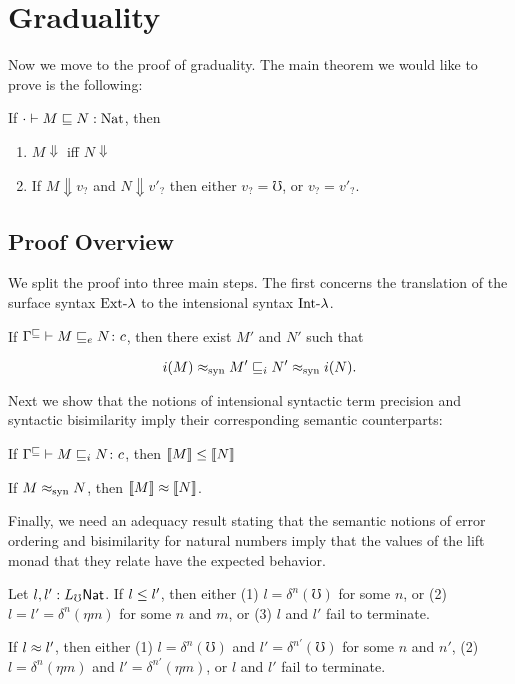 \section{Graduality}\label{sec:graduality}
Now we move to the proof of graduality.
The main theorem we would like to prove is the following:

\begin{theorem}[Graduality]
  If $\cdot \vdash M \sqsubseteq N : \text{Nat}$, then
  \begin{enumerate}
    \item $M \Downarrow$ iff $N \Downarrow$
    \item If $M \Downarrow v_?$ and $N \Downarrow v'_?$ then either $v_? = \mho$, or $v_? = v'_?$.
  \end{enumerate}
\end{theorem}

\subsection{Proof Overview}

We split the proof into three main steps. The first concerns the translation
of the surface syntax $\text{Ext-}\lambda$ to the intensional syntax $\text{Int-}\lambda$.

\begin{lemma}[]
  If ${\Gamma^\sqsubseteq} \vdash {M} \sqsubseteq_e {N} \colon {c}$, then there exist $M'$ and $N'$ such that

  \[ i(M) \approx_{\text{syn}} M' \sqsubseteq_i N' \approx_{\text{syn}} i(N). \]
\end{lemma}

Next we show that the notions of intensional syntactic term precision and
syntactic bisimilarity imply their corresponding semantic counterparts:

\begin{lemma}[]
  If ${\Gamma^\sqsubseteq} \vdash {M} \sqsubseteq_i {N} \colon {c}$, then $\llbracket {M} \rrbracket \le {\llbracket {N} \rrbracket}$
\end{lemma}

\begin{lemma}
  If $M \approx_{\text{syn}} N$, then $\llbracket {M} \rrbracket \approx \llbracket {N} \rrbracket$.
\end{lemma}

Finally, we need an adequacy result stating that the semantic notions of error
ordering and bisimilarity for natural numbers imply that the values of the
lift monad that they relate have the expected behavior.

\begin{lemma}
  Let $l, l' : L_\mho \mathsf{Nat}$.
  If $l \le l'$, then either (1) $l = \delta^n(\mho)$ for some $n$, or (2) 
  $l = l' = \delta^n(\eta m)$ for some $n$ and $m$, or (3) $l$ and $l'$ fail to terminate.
\end{lemma}

\begin{lemma}
  If $l \approx l'$, then either (1) $l = \delta^n(\mho)$ and $l' = \delta^{n'}(\mho)$ for some $n$ and $n'$,
  (2) $l = \delta^n(\eta m)$ and $l' = \delta^{n'}(\eta m)$, or $l$ and $l'$ fail to terminate.
\end{lemma}